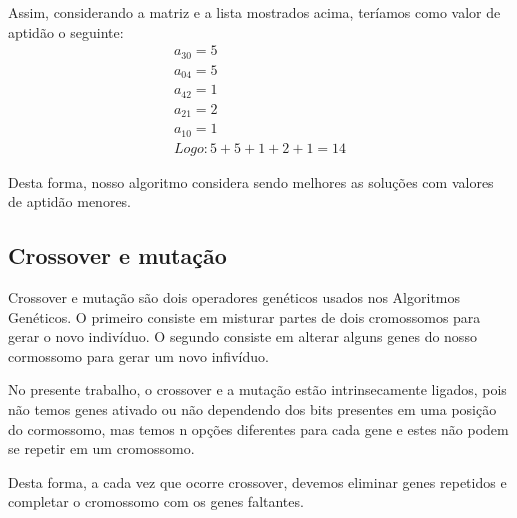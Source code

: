 \documentclass[a4paper,12pt]{article}
\begin{document}
  Assim, considerando a matriz e a lista mostrados acima, teríamos como valor de
  aptidão o seguinte:
  \begin{align*}
    a_{30}=5 \\
    a_{04}=5 \\
    a_{42}=1 \\
    a_{21}=2 \\
    a_{10}=1 \\
    Logo: 5+5+1+2+1 = 14
  \end{align*}

  Desta forma, nosso algoritmo considera sendo melhores as soluções com valores
  de aptidão menores.

  \subsection{Crossover e mutação}
  Crossover e mutação são dois operadores genéticos usados nos Algoritmos
  Genéticos. O primeiro consiste em misturar partes de dois cromossomos para
  gerar o novo indivíduo. O segundo consiste em alterar alguns genes do nosso
  cormossomo para gerar um novo infivíduo.

  No presente trabalho, o crossover e a mutação estão intrinsecamente ligados,
  pois não temos genes ativado ou não dependendo dos bits presentes em uma
  posição do cormossomo, mas temos n opções diferentes para cada gene e estes
  não podem se repetir em um cromossomo.

  Desta forma, a cada vez que ocorre crossover, devemos eliminar genes repetidos
  e completar o cromossomo com os genes faltantes.

  
\end{document}
